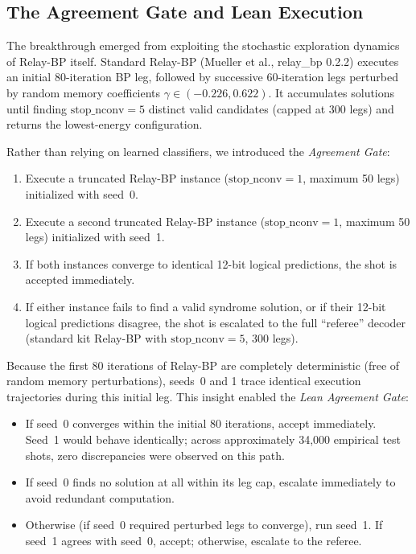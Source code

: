 \subsection{The Agreement Gate and Lean Execution}

The breakthrough emerged from exploiting the stochastic exploration dynamics of Relay-BP itself. Standard Relay-BP (Mueller et al., relay\_bp 0.2.2) executes an initial 80-iteration BP leg, followed by successive 60-iteration legs perturbed by random memory coefficients $\gamma \in (-0.226, 0.622)$. It accumulates solutions until finding $\text{stop\_nconv} = 5$ distinct valid candidates (capped at 300 legs) and returns the lowest-energy configuration.

Rather than relying on learned classifiers, we introduced the \textit{Agreement Gate}:
\begin{enumerate}
    \item Execute a truncated Relay-BP instance ($\text{stop\_nconv} = 1$, maximum 50 legs) initialized with seed~0.
    \item Execute a second truncated Relay-BP instance ($\text{stop\_nconv} = 1$, maximum 50 legs) initialized with seed~1.
    \item If both instances converge to identical 12-bit logical predictions, the shot is accepted immediately.
    \item If either instance fails to find a valid syndrome solution, or if their 12-bit logical predictions disagree, the shot is escalated to the full ``referee'' decoder (standard kit Relay-BP with $\text{stop\_nconv} = 5$, 300 legs).
\end{enumerate}

Because the first 80 iterations of Relay-BP are completely deterministic (free of random memory perturbations), seeds~0 and 1 trace identical execution trajectories during this initial leg. This insight enabled the \textit{Lean Agreement Gate}:
\begin{itemize}
    \item If seed~0 converges within the initial 80 iterations, accept immediately. Seed~1 would behave identically; across approximately 34,000 empirical test shots, zero discrepancies were observed on this path.
    \item If seed~0 finds no solution at all within its leg cap, escalate immediately to avoid redundant computation.
    \item Otherwise (if seed~0 required perturbed legs to converge), run seed~1. If seed~1 agrees with seed~0, accept; otherwise, escalate to the referee.
\end{itemize}

